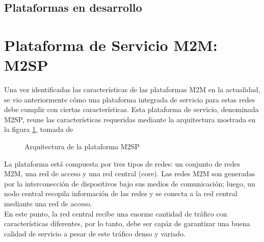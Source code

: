 \documentclass[journal]{IEEEtran}
\begin{document}
\subsection{Plataformas en desarrollo}

\section{Plataforma de Servicio M2M: M2SP}

Una vez identificadas las características de las plataformas M2M en la actualidad, se vio anteriormente cómo una plataforma integrada de servicio para estas redes debe cumplir con ciertas características. Esta plataforma de servicio, denominada M2SP, reune las características requeridas mediante la arquitectura mostrada en la figura \ref{arqM2SP}, tomada de \cite{paper1} 

\begin{figure}[h]
\centering
{}
\caption{Arquitectura de la plataforma M2SP}
\label{arqM2SP}
\end{figure}

La plataforma está compuesta por tres tipos de redes: un conjunto de redes M2M, una red de acceso y una red central (core). Las redes M2M son generadas por la interconección de dispositivos bajo sus medios de comunicación; luego, un nodo central recopila información de las redes y se conecta a la red central mediante una red de acceso.\\

En este punto, la red central recibe una enorme cantidad de tráfico con características diferentes, por lo tanto, debe ser capáz de garantizar una buena calidad de servicio a pesar de este tráfico denso y variado.\\
\end{document}
